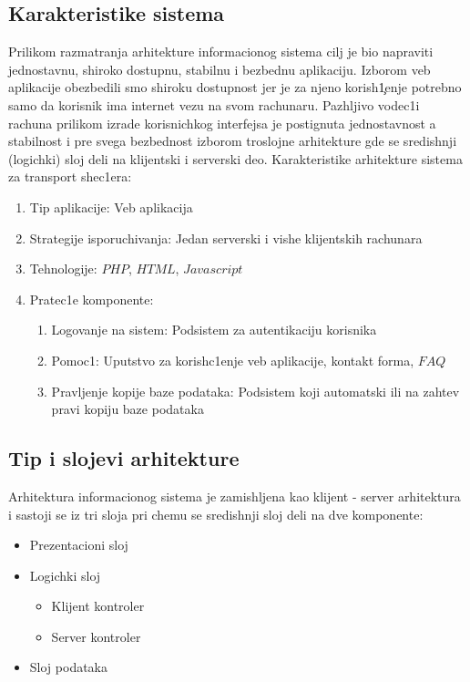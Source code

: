 \subsection{Karakteristike sistema}
Prilikom razmatranja arhitekture informacionog sistema cilj je bio napraviti jednostavnu, shiroko dostupnu, stabilnu i bezbednu aplikaciju. Izborom veb aplikacije obezbedili smo shiroku dostupnost jer je za njeno korish\c1enje potrebno samo da korisnik ima
internet vezu na svom rachunaru. Pazhljivo vodec1i rachuna prilikom izrade korisnichkog
interfejsa je postignuta jednostavnost a stabilnost i pre svega bezbednost izborom
troslojne arhitekture gde se sredishnji (logichki) sloj deli na klijentski i serverski deo.
Karakteristike arhitekture sistema za transport shec1era:
\begin{enumerate}
    \item  Tip aplikacije: Veb aplikacija
    \item Strategije isporuchivanja: Jedan serverski i vishe klijent\-skih rachunara
    \item Tehnologije: $PHP$, $HTML$, $Javascript$
    \item Pratec1e komponente:

    \begin{enumerate}
        \item  Logovanje na sistem: Podsistem za autentikaciju korisnika
        \item Pomoc1: Uput\-stvo za korish\-c1enje veb aplikacije, kontakt forma, $FAQ$
        \item Pravljenje kopije baze podataka: Podsistem koji automatski ili na zahtev pravi kopiju baze podataka
        \end{enumerate}

\end{enumerate}

\subsection{Tip i slojevi arhitekture}
Arhitektura informacionog sistema je zamishljena kao klijent - server arhitektura i
sastoji se iz tri sloja pri chemu se sredishnji sloj deli na dve komponente:
\begin{itemize}
    \item  Prezentacioni sloj
\item Logichki sloj
\begin{itemize}
    \item Klijent kontroler
    \item Server kontroler
\end{itemize}

\item Sloj podataka

\end{itemize}

